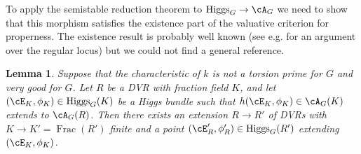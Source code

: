 \documentclass[a4paper]{amsart}
\numberwithin{equation}{section}
\theoremstyle{plain}
\newtheorem{lem}[thm]{Lemma}
\theoremstyle{definition}
\DeclareMathOperator{\Frac}{Frac}
\DeclareMathOperator{\Higgs}{Higgs}
\begin{document}
To apply the semistable reduction theorem to $\Higgs_G \to \cA_G$ we need to show that this morphism satisfies the existence part of the valuative criterion for properness. The existence result is probably well known (see e.g. \cite[\S 8.4]{ChaudouardLaumonLFP1} for an argument over the regular locus) but we could not find a general reference. 
\begin{lem}\label{L:valuativeHiggs}
	Suppose that the characteristic of $k$ is not a torsion prime for  $G$ and very good for $G$.
	Let $R$ be a DVR with fraction field $K$, and let $(\cE_K,\phi_K)\in \Higgs_G(K)$ be a Higgs bundle such that $h(\cE_K,\phi_K)\in  \cA_G(K)$ extends to $\cA_G(R)$. Then there exists an extension $R \to R'$ of DVRs with $K \to K'=\Frac(R')$ finite	
	and a point $(\cE_R^\prime,\phi_R^\prime)\in \Higgs_G(R^\prime)$ extending $(\cE_K,\phi_K)$. 
\end{lem}
\end{document}
